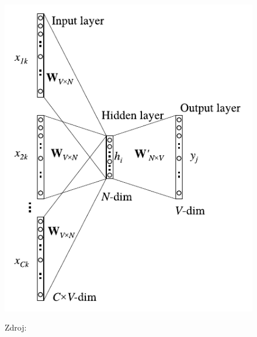 \begin{frame}
\begin{figure}[H]
\begin{center}
\includegraphics[width=0.3\paperwidth]{figs/rong14_fig2}
\bigskip\par
Zdroj: \textcite[obrázek 2]{rong14}
\end{center}
\end{figure}
\end{frame}


